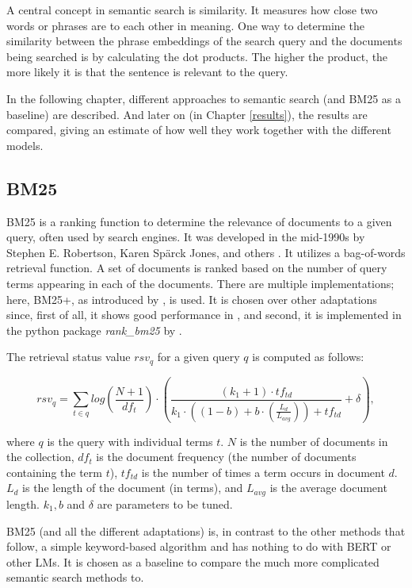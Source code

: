 A central concept in semantic search is similarity. It measures how close two words or phrases are to each other in meaning. One way to determine the similarity between the phrase embeddings of the search query and the documents being searched is by calculating the dot products. The higher the product, the more likely it is that the sentence is relevant to the query.

In the following chapter, different approaches to semantic search (and BM25 as a baseline) are described. And later on (in Chapter \ref{results}), the results are compared, giving an estimate of how well they work together with the different models.


\subsection{BM25} \label{bm25}

BM25 is a ranking function to determine the relevance of documents to a given query, often used by search engines. It was developed in the mid-1990s by Stephen E. Robertson, Karen Spärck Jones, and others \citep{robertson1995okapi}. It utilizes a bag-of-words retrieval function. A set of documents is ranked based on the number of query terms appearing in each of the documents. There are multiple implementations; here, BM25+, as introduced by \citet{lv2011lower}, is used. It is chosen over other adaptations since, first of all, it shows good performance in \citet{trotman2014rankbm25}, and second, it is implemented in the python package \textit{rank\_bm25} by \citet{rank_bm25}.

The retrieval status value $rsv_q$ for a given query $q$ is computed as follows:

\begin{equation}
    rsv_q = \sum_{t \in q} log \left( \frac{N+1}{df_t} \right) \cdot \left( \frac{(k_1 + 1) \cdot tf_{td}}{k_1 \cdot \left( (1-b)+b \cdot \left( \frac{L_d}{L_{avg}}\right) \right) +tf_{td}} + \delta \right),
\end{equation}

where $q$ is the query with individual terms $t$. $N$ is the number of documents in the collection, $df_t$ is the document frequency (the number of documents containing the term $t$), $tf_{td}$ is the number of times a term occurs in document $d$. $L_d$ is the length of the document (in terms), and $L_{avg}$ is the average document length. $k_1, b$ and $\delta$ are parameters to be tuned.

BM25 (and all the different adaptations) is, in contrast to the other methods that follow, a simple keyword-based algorithm and has nothing to do with BERT or other LMs. It is chosen as a baseline to compare the much more complicated semantic search methods to.


